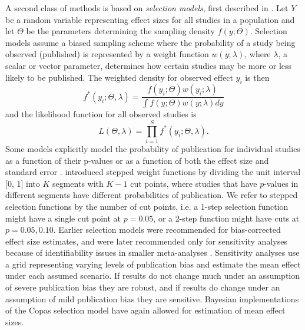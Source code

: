 \documentclass[12pt]{article}   	%
\numberwithin{equation}{section}
\begin{document}
A second class of methods is based on \textit{selection models}, first described in \citet{hedges1984selection}. Let $Y$ be a random variable representing effect sizes for all studies in a population and let $\Theta$ be the parameters determining the sampling density $f(y;\Theta)$. Selection models assume a biased sampling scheme where the probability of a study being observed (published) is represented by a weight function $w(y; \lambda)$, where $\lambda$, a scalar or vector parameter, determines how certain studies may be more or less likely to be published. The weighted density for observed effect $y_i$ is then
\begin{equation}
f^*(y_i ;  \Theta, \lambda) = \frac{f(y_i;\Theta) w(y_i; \lambda)}{\int f(y ; \Theta) w(y; \lambda) dy}
\end{equation}
and the likelihood function for all observed studies is 
\begin{equation}
L(\Theta, \lambda) = \prod_{i = 1}^S f^*(y_i; \Theta, \lambda).
\end{equation}
Some models explicitly model the probability of publication for individual studies as a function of their p-values \citep{iyengar1988selection, hedges1992selection, givens1997, vevea1995pubbias} or as a function of both the effect size and standard error \citep{copas1999what, copas2000funnel, copas2001sensitivity}. \citet{hedges1992selection} introduced stepped weight functions by dividing the unit interval [0, 1] into $K$ segments with $K-1$ cut points, where studies that have $p$-values in different segments have different probabilities of publication. We refer to stepped selection functions by the number of cut points, i.e. a 1-step selection function might have a single cut point at $p=0.05$, or a 2-step function might have cuts at $p=0.05, 0.10$. Earlier selection models were recommended for bias-corrected effect size estimates, and were later recommended only for sensitivity analyses because of identifiability issues in smaller meta-analyses \citep{vevea2005sensitivity, jin2015methods}. Sensitivity analyses use a grid representing varying levels of publication bias and estimate the mean effect under each assumed scenario. If results do not change much under an assumption of severe publication bias they are robust, and if results do change under an assumption of mild publication bias they are sensitive. Bayesian implementations of the Copas selection model \citep{mavridis2013copas, bai2020} have again allowed for estimation of mean effect sizes.
\end{document}
